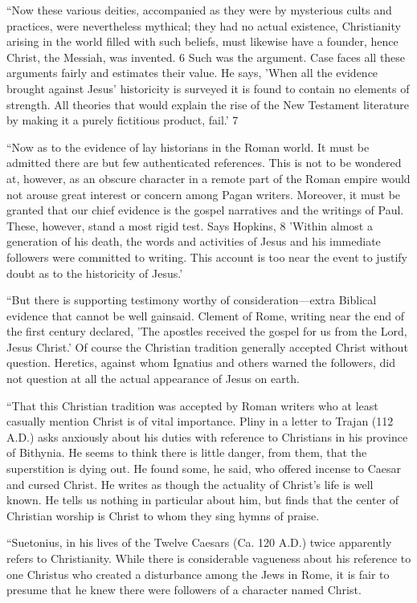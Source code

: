 ``Now these various deities, accompanied as they were by mysterious cults and practices,
were nevertheless mythical; they had no actual existence, Christianity arising in the world
filled with such beliefs, must likewise have a founder, hence Christ, the Messiah, was
invented. 6 Such was the argument. Case faces all these arguments fairly and estimates their
value. He says, 'When all the evidence brought against Jesus' historicity is surveyed it is
found to contain no elements of strength. All theories that would explain the rise of the New
Testament literature by making it a purely fictitious product, fail.' 7

``Now as to the evidence of lay historians in the Roman world. It must be admitted there are
but few authenticated references. This is not to be wondered at, however, as an obscure
character in a remote part of the Roman empire would not arouse great interest or concern
among Pagan writers. Moreover, it must be granted that our chief evidence is the gospel
narratives and the writings of Paul. These, however, stand a most rigid test. Says Hopkins, 8
'Within almost a generation of his death, the words and activities of Jesus and his immediate
followers were committed to writing. This account is too near the event to justify doubt as to
the historicity of Jesus.'

``But there is supporting testimony worthy of consideration—extra Biblical evidence that
cannot be well gainsaid. Clement of Rome, writing near the end of the first century declared,
'The apostles received the gospel for us from the Lord, Jesus Christ.' Of course the Christian
tradition generally accepted Christ without question. Heretics, against whom Ignatius and
others warned the followers, did not question at all the actual appearance of Jesus on earth.

``That this Christian tradition was accepted by Roman writers who at least casually mention
Christ is of vital importance. Pliny in a letter to Trajan (112 A.D.) asks anxiously about his
duties with reference to Christians in his province of Bithynia. He seems to think there is
little danger, from them, that the superstition is dying out. He found some, he said, who
offered incense to Caesar and cursed Christ. He writes as though the actuality of Christ's life
is well known. He tells us nothing in particular about him, but finds that the center of
Christian worship is Christ to whom they sing hymns of praise.

``Suetonius, in his lives of the Twelve Caesars (Ca. 120 A.D.) twice apparently refers to
Christianity. While there is considerable vagueness about his reference to one Christus who
created a disturbance among the Jews in Rome, it is fair to presume that he knew there were
followers of a character named Christ.


